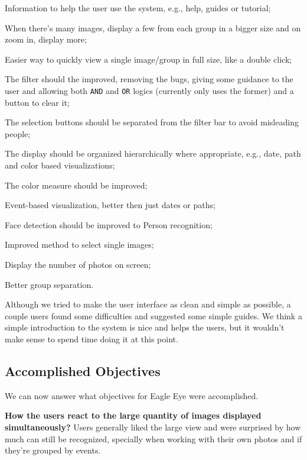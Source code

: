 {\begin{myitemize}
	\item Information to help the user use the system, e.g., help, guides or tutorial;
	\item When there's many images, display a few from each group in a bigger size and on zoom in, display more;
	\item Easier way to quickly view a single image/group in full size, like a double click;
	\item The filter should the improved, removing the bugs, giving some guidance to the user and allowing both \texttt{AND} and \texttt{OR} logics (currently only uses the former) and a button to clear it;
	\item The selection buttons should be separated from the filter bar to avoid misleading people;
	\item The display should be organized hierarchically where appropriate, e.g., date, path and color based visualizations;
	\item The color measure should be improved;
	\item Event-based visualization, better then just dates or paths;
	\item Face detection should be improved to Person recognition;
	\item Improved method to select single images;
	\item Display the number of photos on screen;
	\item Better group separation.
\end{myitemize}

Although we tried to make the user interface as clean and simple as possible, a couple users found some difficulties and suggested some simple guides. We think a simple introduction to the system is nice and helps the users, but it wouldn't make sense to spend time doing it at this point.

\pagebreak




\subsection{Accomplished Objectives} 

We can now answer what objectives for Eagle Eye were accomplished. 




\textbf{How the users react to the large quantity of images displayed simultaneously?}
Users generally liked the large view and were surprised by how much can still be recognized, specially when working with their own photos and if they're grouped by events. 




}
